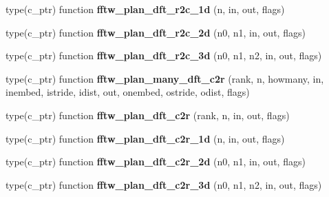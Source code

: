 \begin{DoxyCompactItemize}
\item 
type(c\+\_\+ptr) function {\bfseries fftw\+\_\+plan\+\_\+dft\+\_\+r2c\+\_\+1d} (n, in, out, flags)\hypertarget{interfacefftw3_1_1fftw__plan__gen_a9b940eab983d8126a05f913925b4d65d}{}\label{interfacefftw3_1_1fftw__plan__gen_a9b940eab983d8126a05f913925b4d65d}

\item 
type(c\+\_\+ptr) function {\bfseries fftw\+\_\+plan\+\_\+dft\+\_\+r2c\+\_\+2d} (n0, n1, in, out, flags)\hypertarget{interfacefftw3_1_1fftw__plan__gen_a476c98129de04ace3bbd726abe6fa98c}{}\label{interfacefftw3_1_1fftw__plan__gen_a476c98129de04ace3bbd726abe6fa98c}

\item 
type(c\+\_\+ptr) function {\bfseries fftw\+\_\+plan\+\_\+dft\+\_\+r2c\+\_\+3d} (n0, n1, n2, in, out, flags)\hypertarget{interfacefftw3_1_1fftw__plan__gen_a8c1c9d49cb9f322910b32cff3c55ab5e}{}\label{interfacefftw3_1_1fftw__plan__gen_a8c1c9d49cb9f322910b32cff3c55ab5e}

\item 
type(c\+\_\+ptr) function {\bfseries fftw\+\_\+plan\+\_\+many\+\_\+dft\+\_\+c2r} (rank, n, howmany, in, inembed, istride, idist, out, onembed, ostride, odist, flags)\hypertarget{interfacefftw3_1_1fftw__plan__gen_a27b03d0f56ef318a221c21066c2e270b}{}\label{interfacefftw3_1_1fftw__plan__gen_a27b03d0f56ef318a221c21066c2e270b}

\item 
type(c\+\_\+ptr) function {\bfseries fftw\+\_\+plan\+\_\+dft\+\_\+c2r} (rank, n, in, out, flags)\hypertarget{interfacefftw3_1_1fftw__plan__gen_a894e05e1e859bade8760b5edfdc75994}{}\label{interfacefftw3_1_1fftw__plan__gen_a894e05e1e859bade8760b5edfdc75994}

\item 
type(c\+\_\+ptr) function {\bfseries fftw\+\_\+plan\+\_\+dft\+\_\+c2r\+\_\+1d} (n, in, out, flags)\hypertarget{interfacefftw3_1_1fftw__plan__gen_a8a8ebe68ea38d8e6ecc2bf76fddbf383}{}\label{interfacefftw3_1_1fftw__plan__gen_a8a8ebe68ea38d8e6ecc2bf76fddbf383}

\item 
type(c\+\_\+ptr) function {\bfseries fftw\+\_\+plan\+\_\+dft\+\_\+c2r\+\_\+2d} (n0, n1, in, out, flags)\hypertarget{interfacefftw3_1_1fftw__plan__gen_adea21ba236a08c78a24b2da5acd7ccc0}{}\label{interfacefftw3_1_1fftw__plan__gen_adea21ba236a08c78a24b2da5acd7ccc0}

\item 
type(c\+\_\+ptr) function {\bfseries fftw\+\_\+plan\+\_\+dft\+\_\+c2r\+\_\+3d} (n0, n1, n2, in, out, flags)\hypertarget{interfacefftw3_1_1fftw__plan__gen_a0ae72826f5041e1cabd9bb457aa21b15}{}\label{interfacefftw3_1_1fftw__plan__gen_a0ae72826f5041e1cabd9bb457aa21b15}


\end{DoxyCompactItemize}
